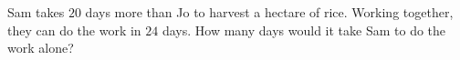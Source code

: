 Sam takes $20$ days more than Jo to harvest a hectare of rice. Working together, they can do the work in $24$ days. How many days would it take Sam to do the work alone?
